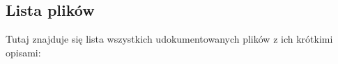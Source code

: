 \subsection{Lista plików}
Tutaj znajduje się lista wszystkich udokumentowanych plików z ich krótkimi opisami\+:\begin{DoxyCompactList}
\item{}
\end{DoxyCompactList}

